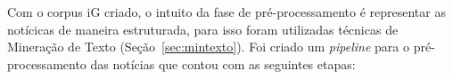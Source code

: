 \documentclass[
    12pt,                %
    oneside,            %
    a4paper,            %
    english,            %
    brazil                %
    ]{abntex2ppgsi}
\begin{document}
Com o corpus iG criado, o intuito da fase de pré-processamento é representar as notícicas de maneira estruturada, para isso foram utilizadas técnicas de Mineração de Texto (Seção~\ref{sec:mintexto}).
Foi criado um \textit{pipeline} para o pré-processamento das notícias que contou com as seguintes etapas:
\end{document}
